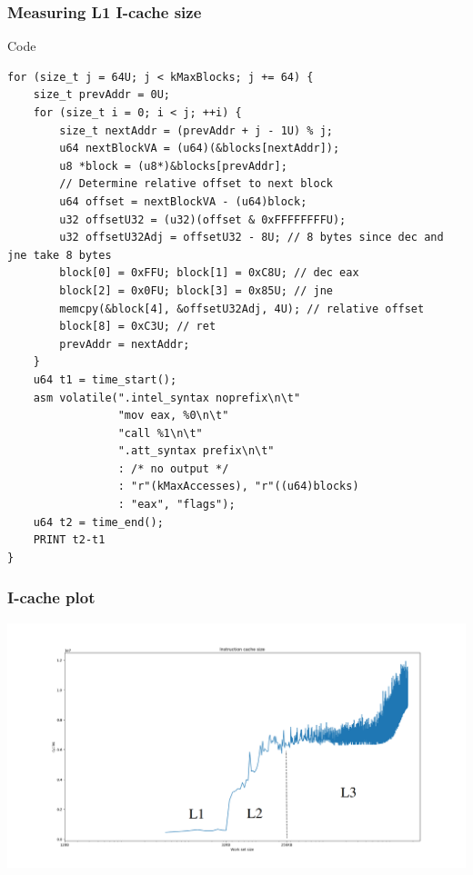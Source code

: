 \documentclass{beamer}
\begin{document}
\begin{frame}[fragile]
\frametitle{Measuring L1 I-cache size}
\begin{block}{Code}
\begin{lstlisting}[style=code]
for (size_t j = 64U; j < kMaxBlocks; j += 64) {
    size_t prevAddr = 0U;
    for (size_t i = 0; i < j; ++i) {
        size_t nextAddr = (prevAddr + j - 1U) % j;
        u64 nextBlockVA = (u64)(&blocks[nextAddr]);
        u8 *block = (u8*)&blocks[prevAddr];
        // Determine relative offset to next block
        u64 offset = nextBlockVA - (u64)block;
        u32 offsetU32 = (u32)(offset & 0xFFFFFFFFU);
        u32 offsetU32Adj = offsetU32 - 8U; // 8 bytes since dec and jne take 8 bytes
        block[0] = 0xFFU; block[1] = 0xC8U; // dec eax
        block[2] = 0x0FU; block[3] = 0x85U; // jne
        memcpy(&block[4], &offsetU32Adj, 4U); // relative offset
        block[8] = 0xC3U; // ret
        prevAddr = nextAddr;
    }
    u64 t1 = time_start();
    asm volatile(".intel_syntax noprefix\n\t"
                 "mov eax, %0\n\t"
                 "call %1\n\t"
                 ".att_syntax prefix\n\t"
                 : /* no output */
                 : "r"(kMaxAccesses), "r"((u64)blocks)
                 : "eax", "flags");
    u64 t2 = time_end();
    PRINT t2-t1
}

\end{lstlisting}
\end{block}
\end{frame}

\begin{frame}
\frametitle{I-cache plot}
\includegraphics[scale=.25]{img/instr_size.png}
\end{frame}
\end{document}
